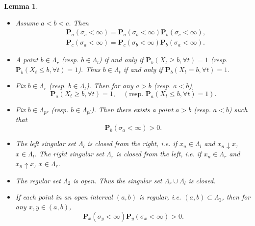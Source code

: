 \documentclass[a4paper]{amsart}
\newtheorem{lemma}[theorem]{Lemma}
\theoremstyle{definition}
\theoremstyle{remark}
\numberwithin{equation}{section}
\begin{document}
\begin{lemma}\label{LM25}
\begin{itemize}
\item[(1)] Assume $a<b<c$. Then
\[
\begin{aligned}	&\mathbf{P}_a(\sigma_c<\infty)=\mathbf{P}_a(\sigma_b<\infty)\mathbf{P}_b(\sigma_c<\infty),\\
&\mathbf{P}_c(\sigma_a<\infty)=\mathbf{P}_c(\sigma_b<\infty)\mathbf{P}_b(\sigma_a<\infty).
\end{aligned}\]
\item[(2)] A point $b\in \Lambda_r$ (resp. $b\in \Lambda_l$) if and only if $\mathbf{P}_b(X_t\geq b, \forall t)=1$ (resp.  $\mathbf{P}_b(X_t\leq b, \forall t)=1$). Thus $b\in \Lambda_t$ if and only if $\mathbf{P}_b(X_t= b, \forall t)=1$.
\item[(3)] Fix $b\in \Lambda_r$ (resp. $b\in \Lambda_l$). Then for any $a>b$ (resp. $a<b$),
\[
	\mathbf{P}_a(X_t\geq b, \forall t)=1,\quad (\text{resp. }\mathbf{P}_a(X_t\leq b, \forall t)=1).
\]
\item[(4)] Fix $b\in \Lambda_{pr}$ (resp. $b\in \Lambda_{pl}$). Then there exists a point $a>b$ (resp. $a<b$) such that
\[
\mathbf{P}_b(\sigma_a<\infty)>0.
\]
\item[(5)] The left singular set $\Lambda_l$ is closed from the right, i.e. if $x_n\in \Lambda_l$ and $x_n\downarrow x$, $x\in \Lambda_l$. The right singular set $\Lambda_r$ is closed from the left, i.e. if $x_n\in \Lambda_r$ and $x_n\uparrow x$, $x\in \Lambda_r$.
\item[(6)] The regular set $\Lambda_2$ is open. Thus the singular set $\Lambda_r\cup \Lambda_l$ is closed.
\item[(7)] If each point in an open interval $(a,b)$ is regular, i.e. $(a,b)\subset \Lambda_2$, then for any $x,y\in (a,b)$,
\[
	\mathbf{P}_x(\sigma_y<\infty)\mathbf{P}_y(\sigma_x<\infty)>0.
\]
\end{itemize}
\end{lemma}
\end{document}
